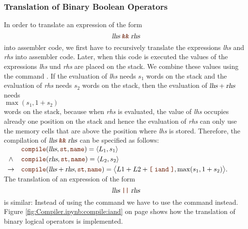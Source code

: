 \subsubsection{Translation of Binary Boolean Operators}
In order to translate an expression of the form
\[ \textsl{lhs} \;\mytt{\&\&}\; \textsl{rhs} \]
into assembler code, we first have to recursively translate the expressions \textsl{lhs} and
\textsl{rhs} into assembler code.  Later, when this code is executed the values of the expressions
\textsl{lhs} und \textsl{rhs} are placed on the stack.  We combine these values using the command .
If the evaluation of \textsl{lhs} needs $s_1$ words on the stack and the evaluation of \textsl{rhs} needs $s_2$
words on the stack, then the evaluation of $\textsl{lhs} + \textsl{rhs}$ needs 
\\[0.2cm]
\hspace*{1.3cm}
$\max(s_1, 1 + s_2)$
\\[0.2cm]
words on the stack, because when \textsl{rhs} is evaluated, the value of \textsl{lhs} occupies already one position
on the stack and hence the evaluation of \textsl{rhs} can only use the memory cells that are above the position
where \textsl{lhs} is stored. Therefore, the compilation of $\textsl{lhs} \;\mytt{\&\&}\; \textsl{rhs}$ can be
specified as follows:
\\[0.2cm]
\hspace*{1.3cm}
$
\begin{array}[t]{cll}
        & \mytt{compile}(\textsl{lhs}, \mytt{st}, \mytt{name}) = \pair(L_1, s_1)  \\[0.1cm]
\wedge  & \mytt{compile}(\textsl{rhs}, \mytt{st}, \mytt{name}) = \pair(L_2, s_2)  \\[0.1cm]
\rightarrow & \mytt{compile}(\textsl{lhs} + \textsl{rhs}, \mytt{st}, \mytt{name}) = 
            \bigl\langle L1 + L2 + \mytt{[}\; \mytt{iand} \;\mytt{]}, \max(s_1, 1+s_2) \bigr\rangle.
\end{array}$
\\[0.2cm]
The translation of an expression of the form
\[ \textsl{lhs} \;\mytt{||}\; \textsl{rhs} \]
is similar:  Instead of using the command  we have to use the command  instead.
Figure \ref{fig:Compiler.ipynb:compile:iand} on page \pageref{fig:Compiler.ipynb:compile:iand} shows how the
translation of binary logical operators is implemented.

